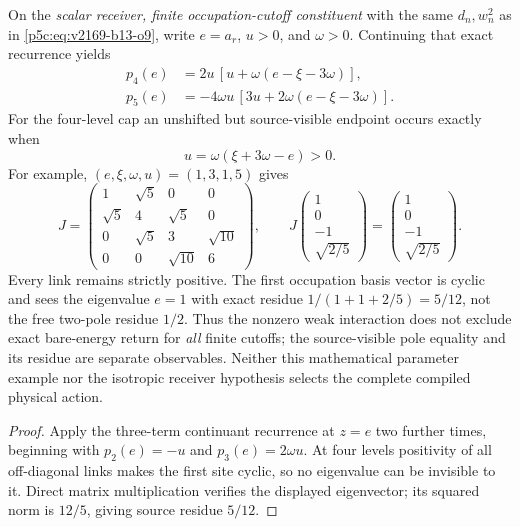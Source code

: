 \documentclass[11pt,a4paper]{article}
\begin{document}
\begin{proposition}
\label{p5c:prop:v239-jacobi-endpoint-interference}
On the \emph{scalar receiver, finite occupation-cutoff constituent}
with the same $d_n,w_n^2$ as in \eqref{p5c:eq:v2169-b13-o9}, write
$e=a_r$, $u>0$, and $\omega>0$. Continuing that exact recurrence yields
\begin{align*}
 p_4(e)&=2u\,[u+\omega(e-\xi-3\omega)],\\
 p_5(e)&=-4\omega u\,[3u+2\omega(e-\xi-3\omega)].
\end{align*}
For the four-level cap an unshifted but source-visible endpoint occurs
exactly when
\begin{equation}\label{p5c:eq:v239-jacobi-four-level-return}
 \boxed{u=\omega(\xi+3\omega-e)>0.}
\end{equation}
For example, $(e,\xi,\omega,u)=(1,3,1,5)$ gives
\[
 J=\begin{pmatrix}
 1&\sqrt5&0&0\\
 \sqrt5&4&\sqrt5&0\\
 0&\sqrt5&3&\sqrt{10}\\
 0&0&\sqrt{10}&6
 \end{pmatrix},\qquad
 J\begin{pmatrix}1\\0\\-1\\\sqrt{2/5}\end{pmatrix}
 =\begin{pmatrix}1\\0\\-1\\\sqrt{2/5}\end{pmatrix}.
\]
Every link remains strictly positive. The first occupation basis
vector is cyclic and sees the eigenvalue $e=1$ with exact residue
$1/(1+1+2/5)=5/12$, not the free two-pole residue $1/2$.
Thus the nonzero weak interaction does not exclude exact bare-energy
return for \emph{all} finite cutoffs; the source-visible pole equality
and its residue are separate observables. Neither this mathematical
parameter example nor the isotropic receiver hypothesis selects the
complete compiled physical action.
\end{proposition}
\begin{proof}
Apply the three-term continuant recurrence at $z=e$ two further
times, beginning with $p_2(e)=-u$ and $p_3(e)=2\omega u$.
At four levels positivity of all off-diagonal links makes the first
site cyclic, so no eigenvalue can be invisible to it. Direct matrix
multiplication verifies the displayed eigenvector; its squared norm
is $12/5$, giving source residue $5/12$.
\end{proof}
\end{document}
